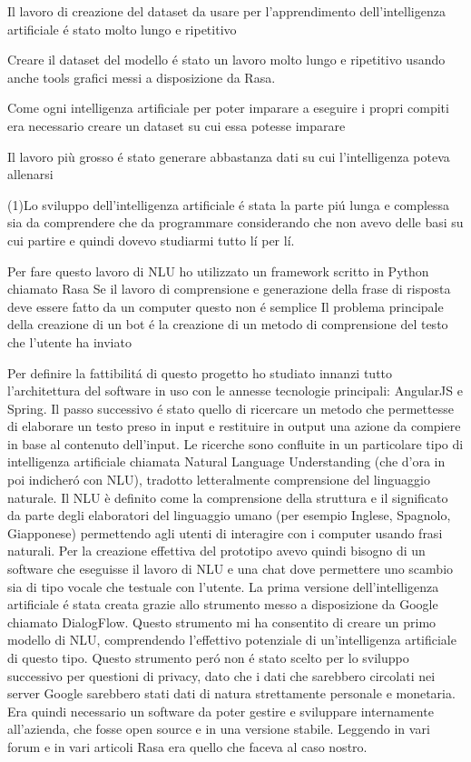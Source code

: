 Il lavoro di creazione del dataset da usare per l'apprendimento dell'intelligenza artificiale \'e stato molto lungo e ripetitivo 

Creare il dataset del modello \'e stato un lavoro molto lungo e ripetitivo usando anche tools grafici messi a disposizione da Rasa.

Come ogni intelligenza artificiale per poter imparare a eseguire i propri compiti era necessario creare un dataset su cui essa potesse imparare

Il lavoro più grosso \'e stato generare abbastanza dati su cui l'intelligenza poteva allenarsi




(1)Lo sviluppo dell'intelligenza artificiale \'e stata la parte pi\'u lunga e complessa sia da comprendere che da programmare considerando che non avevo delle basi su cui partire e quindi dovevo studiarmi tutto l\'i per l\'i.

Per fare questo lavoro di NLU ho utilizzato un framework scritto in Python chiamato Rasa
Se il lavoro di comprensione e generazione della frase di risposta deve essere fatto da un computer questo non \'e semplice
Il problema principale della creazione di un bot \'e la creazione di un metodo di comprensione del testo che l'utente ha inviato



Per definire la fattibilit\'{a} di questo progetto ho studiato innanzi tutto l'architettura del software in uso con le annesse tecnologie principali: AngularJS e Spring.
Il passo successivo \'{e} stato quello di ricercare un metodo che permettesse di elaborare un testo preso in input e restituire in output una azione da compiere in base al contenuto dell'input. Le ricerche sono confluite in un particolare tipo di intelligenza artificiale chiamata Natural Language Understanding (che d'ora in poi indicher\'{o} con NLU), tradotto letteralmente comprensione del linguaggio naturale. 
Il NLU \`{e} definito come la comprensione della struttura e il significato da parte degli elaboratori del linguaggio umano (per esempio Inglese, Spagnolo, Giapponese) permettendo agli utenti di interagire con i computer usando frasi naturali.
Per la creazione effettiva del prototipo avevo quindi bisogno di un software che eseguisse il lavoro di NLU e una chat dove permettere uno scambio sia di tipo vocale che testuale con l'utente.
La prima versione dell'intelligenza artificiale \'e stata creata grazie allo strumento messo a disposizione da Google chiamato DialogFlow. Questo strumento mi ha consentito di creare un primo modello di NLU, comprendendo l'effettivo potenziale di un'intelligenza artificiale di questo tipo. 
Questo strumento per\'o non \'e stato scelto per lo sviluppo successivo per questioni di privacy, dato che i dati che sarebbero circolati nei server Google sarebbero stati dati di natura strettamente personale e monetaria.
Era quindi necessario un software da poter gestire e sviluppare internamente all'azienda, che fosse open source e in una versione stabile. Leggendo in vari forum e in vari articoli Rasa era quello che faceva al caso nostro.





